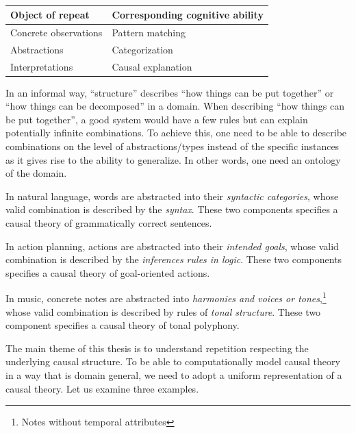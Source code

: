 \begin{table}
    \centering
    \begin{tabular}{l l}
        Object of repeat & Corresponding cognitive ability \\
        \toprule
        Concrete observations & Pattern matching\\
        Abstractions & Categorization\\
        Interpretations & Causal explanation

    \end{tabular}
    \caption{}
    \label{table: object of repeat}
\end{table}

In an informal way, ``structure'' describes ``how things can be put together'' or ``how things can be decomposed'' in a domain. When describing ``how things can be put together'', a good system would have a few rules but can explain potentially infinite combinations. To achieve this, one need to be able to describe combinations on the level of abstractions/types instead of the specific instances as it gives rise to the ability to generalize. In other words, one need an ontology of the domain.  

In natural language, words are abstracted into their \emph{syntactic categories}, whose valid combination is described by the \emph{syntax}. These two components specifies a causal theory of grammatically correct sentences.

In action planning, actions are abstracted into their \emph{intended goals}, whose valid combination is described by the \emph{inferences rules in logic}. These two components specifies a causal theory of goal-oriented actions. 

In music, concrete notes are abstracted into \emph{harmonies and voices or tones},\footnote{Notes without temporal attributes} whose valid combination is described by rules of \emph{tonal structure}. These two component specifies a causal theory of tonal polyphony.

The main theme of this thesis is to understand repetition respecting the underlying causal structure. To be able to computationally model causal theory in a way that is domain general, we need to adopt a uniform representation of a causal theory. Let us examine three examples. 

